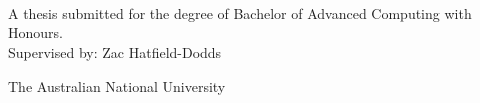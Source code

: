 \begin{titlepage}
  \enlargethispage{2cm}
  \begin{center}
    \makeatletter
    \Huge\textbf{\@title} \\[.4cm]
    \Huge\textbf{\thesisqualifier} \\[2.5cm]
    \huge\textbf{\@author} \\[9cm]
    \makeatother
    \LARGE A thesis submitted for the degree of Bachelor of Advanced Computing with Honours. \\
    Supervised by: Zac Hatfield-Dodds
    
    The Australian National University \\[2cm]
    \thismonth

    \vspace*{\fill}
    \makeatletter
        {\selectfont\textcopyright}\ \@author{} \number\year
        \makeatother
    
  \end{center}
\end{titlepage}
